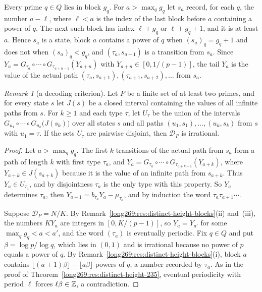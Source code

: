 \documentclass[11pt]{article}
\theoremstyle{remark}
\newtheorem{recordremark}[theorem]{Remark}
\renewenvironment{remark}[1][]{\begin{recordremark}[#1]}{\end{recordremark}}
\theoremstyle{plain}
\begin{document}
Every prime $q\in Q$ lies in block $g_q$.  For $a>\max_qg_q$ let $s_a$ record,
for each $q$, the number $a-\ell$, where $\ell<a$ is the index of the last
block before $a$ containing a power of $q$.  The next such block has index
$\ell+g_q$ or $\ell+g_q+1$, and it is at least $a$.  Hence $s_a$ is a state,
block $a$ contains a power of $q$ when $(s_a)_q=g_q+1$ and does not when
$(s_a)_q<g_q$, and $(\tau_a,s_{a+1})$ is a transition from $s_a$.  Since
$Y_a=G_{\tau_a}\circ\cdots\circ G_{\tau_{a+n-1}}(Y_{a+n})$ with
$Y_{a+n}\in[0,1/(p-1)]$, the tail $Y_a$ is the value of the actual path
$(\tau_a,s_{a+1}),(\tau_{a+1},s_{a+2}),\ldots$ from $s_a$.

\begin{remark}[a decoding criterion]\label{long269:res:distinct-height-criterion}
Let $P$ be a finite set of at least two primes, and for every state $s$ let
$J(s)$ be a closed interval containing the values of all infinite paths from
$s$.  For $k\ge1$ and each type $\tau$, let $U_\tau$ be the union of the
intervals $G_{u_1}\circ\cdots\circ G_{u_k}\bigl(J(s_k)\bigr)$ over all states
$s$ and all paths $(u_1,s_1),\ldots,(u_k,s_k)$ from $s$ with $u_1=\tau$.  If
the sets $U_\tau$ are pairwise disjoint, then $\mathcal D_P$ is irrational.
\end{remark}


\begin{proof}
Let $a>\max_qg_q$.  The first $k$ transitions of the actual path from $s_a$
form a path of length $k$ with first type $\tau_a$, and
$Y_a=G_{\tau_a}\circ\cdots\circ G_{\tau_{a+k-1}}(Y_{a+k})$, where
$Y_{a+k}\in J(s_{a+k})$ because it is the value of an infinite path from
$s_{a+k}$.  Thus $Y_a\in U_{\tau_a}$, and by disjointness $\tau_a$ is the
only type with this property.  So $Y_a$ determines $\tau_a$, then
$Y_{a+1}=b_{\tau_a}Y_a-\mu_{\tau_a}$, and by induction the word
$\tau_a\tau_{a+1}\cdots$.

Suppose $\mathcal D_P=N/K$.  By
Remark~\ref{long269:res:distinct-height-blocks}(ii) and~(iii), the numbers
$KY_a$ are integers in $[0,K/(p-1)]$, so $Y_a=Y_{a'}$ for some
$\max_qg_q<a<a'$, and the word $(\tau_a)$ is eventually periodic.  Fix
$q\in Q$ and put $\beta=\log p/\log q$, which lies in $(0,1)$ and is
irrational because no power of $p$ equals a power of $q$.  By
Remark~\ref{long269:res:distinct-height-blocks}(i), block $a$ contains
$\lfloor(a+1)\beta\rfloor-\lfloor a\beta\rfloor$ powers of $q$, a number
recorded by $\tau_a$.  As in the proof of
Theorem~\ref{long269:res:distinct-height-235}, eventual periodicity with
period $\ell$ forces $\ell\beta\in\mathbb{Z}$, a contradiction.
\end{proof}
\end{document}

